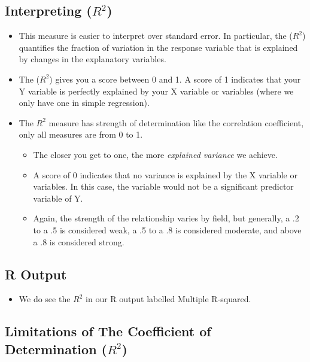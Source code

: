 \documentclass[
  letterpaper,
  DIV=11,
  numbers=noendperiod]{scrreprt}
\providecommand{\tightlist}{%
  \setlength{\itemsep}{0pt}\setlength{\parskip}{0pt}}\usepackage{longtable,booktabs,array}
\begin{document}
\subsection{\texorpdfstring{Interpreting
(\(R^2\))}{Interpreting (R\^{}2)}}\label{interpreting-r2}

\begin{itemize}
\tightlist
\item
  This measure is easier to interpret over standard error. In
  particular, the (\(R^2\)) quantifies the fraction of variation in the
  response variable that is explained by changes in the explanatory
  variables.
\item
  The (\(R^2\)) gives you a score between 0 and 1. A score of 1
  indicates that your Y variable is perfectly explained by your X
  variable or variables (where we only have one in simple regression).
\item
  The \(R^2\) measure has strength of determination like the correlation
  coefficient, only all measures are from 0 to 1.

  \begin{itemize}
  \tightlist
  \item
    The closer you get to one, the more \emph{explained variance} we
    achieve.
  \item
    A score of 0 indicates that no variance is explained by the X
    variable or variables. In this case, the variable would not be a
    significant predictor variable of Y.
  \item
    Again, the strength of the relationship varies by field, but
    generally, a .2 to a .5 is considered weak, a .5 to a .8 is
    considered moderate, and above a .8 is considered strong.
  \end{itemize}
\end{itemize}

\subsection{R Output}\label{r-output-1}

\begin{itemize}
\tightlist
\item
  We do see the \(R^2\) in our R output labelled Multiple R-squared.
\end{itemize}

\subsection{\texorpdfstring{Limitations of The Coefficient of
Determination
(\(R^2\))}{Limitations of The Coefficient of Determination (R\^{}2)}}\label{limitations-of-the-coefficient-of-determination-r2}
\end{document}
